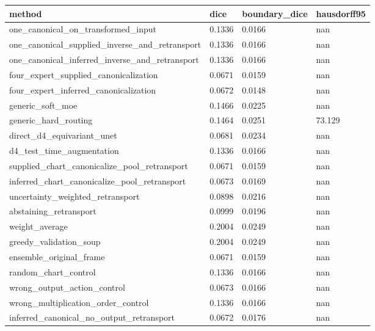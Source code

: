 \begin{tabular}{llll}
\toprule
method & dice & boundary\_dice & hausdorff95 \\
\midrule
one\_canonical\_on\_transformed\_input & 0.1336 & 0.0166 & nan \\
one\_canonical\_supplied\_inverse\_and\_retransport & 0.1336 & 0.0166 & nan \\
one\_canonical\_inferred\_inverse\_and\_retransport & 0.1336 & 0.0166 & nan \\
four\_expert\_supplied\_canonicalization & 0.0671 & 0.0159 & nan \\
four\_expert\_inferred\_canonicalization & 0.0672 & 0.0148 & nan \\
generic\_soft\_moe & 0.1466 & 0.0225 & nan \\
generic\_hard\_routing & 0.1464 & 0.0251 & 73.129 \\
direct\_d4\_equivariant\_unet & 0.0681 & 0.0234 & nan \\
d4\_test\_time\_augmentation & 0.1336 & 0.0166 & nan \\
supplied\_chart\_canonicalize\_pool\_retransport & 0.0671 & 0.0159 & nan \\
inferred\_chart\_canonicalize\_pool\_retransport & 0.0673 & 0.0169 & nan \\
uncertainty\_weighted\_retransport & 0.0898 & 0.0216 & nan \\
abstaining\_retransport & 0.0999 & 0.0196 & nan \\
weight\_average & 0.2004 & 0.0249 & nan \\
greedy\_validation\_soup & 0.2004 & 0.0249 & nan \\
ensemble\_original\_frame & 0.0671 & 0.0159 & nan \\
random\_chart\_control & 0.1336 & 0.0166 & nan \\
wrong\_output\_action\_control & 0.0673 & 0.0166 & nan \\
wrong\_multiplication\_order\_control & 0.1336 & 0.0166 & nan \\
inferred\_canonical\_no\_output\_retransport & 0.0672 & 0.0176 & nan \\
\bottomrule
\end{tabular}
